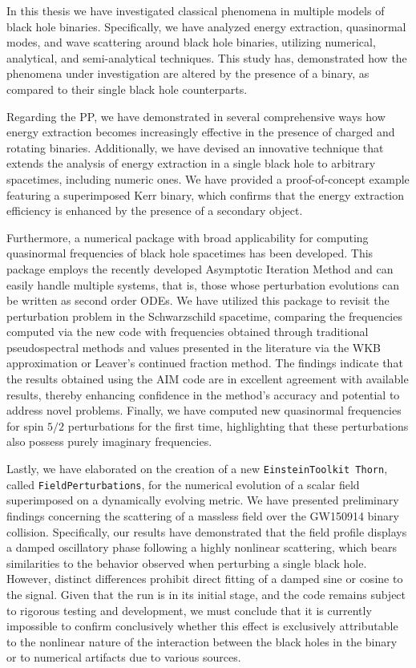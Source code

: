 In this thesis we have investigated classical phenomena in multiple models of black hole binaries. Specifically, we have analyzed energy extraction, quasinormal modes, and wave scattering around black hole binaries, utilizing numerical, analytical, and semi-analytical techniques. This study has, demonstrated how the phenomena under investigation are altered by the presence of a binary, as compared to their single black hole counterparts.

Regarding the \ac{PP}, we have demonstrated in several comprehensive ways how energy extraction becomes increasingly effective in the presence of charged and rotating binaries. Additionally, we have devised an innovative technique that extends the analysis of energy extraction in a single black hole to arbitrary spacetimes, including numeric ones. We have provided a proof-of-concept example featuring a superimposed Kerr binary, which confirms that the energy extraction efficiency is enhanced by the presence of a secondary object.

Furthermore, a numerical package with broad applicability for computing quasinormal frequencies of black hole spacetimes has been developed. This package employs the recently developed Asymptotic Iteration Method and can easily handle multiple systems, that is, those whose perturbation evolutions can be written as second order ODEs. We have utilized this package to revisit the perturbation problem in the Schwarzschild spacetime, comparing the frequencies computed via the new code with frequencies obtained through traditional pseudospectral methods and values presented in the literature via the WKB approximation or Leaver's continued fraction method. The findings indicate that the results obtained using the \ac{AIM} code are in excellent agreement with available results, thereby enhancing confidence in the method's accuracy and potential to address novel problems. Finally, we have computed new quasinormal frequencies for spin $5/2$ perturbations for the first time, highlighting that these perturbations also possess purely imaginary frequencies.

Lastly, we have elaborated on the creation of a new \texttt{EinsteinToolkit Thorn}, called \texttt{FieldPerturbations}, for the numerical evolution of a scalar field superimposed on a dynamically evolving metric. We have presented preliminary findings concerning the scattering of a massless field over the GW150914 binary collision. Specifically, our results have demonstrated that the field profile displays a damped oscillatory phase following a highly nonlinear scattering, which bears similarities to the behavior observed when perturbing a single black hole. However, distinct differences prohibit direct fitting of a damped sine or cosine to the signal. Given that the run is in its initial stage, and the code remains subject to rigorous testing and development, we must conclude that it is currently impossible to confirm conclusively whether this effect is exclusively attributable to the nonlinear nature of the interaction between the black holes in the binary or to numerical artifacts due to various sources.

